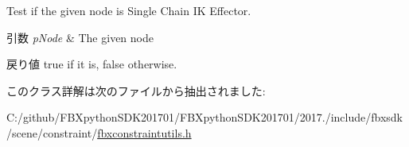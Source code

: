 Test if the given node is Single Chain IK Effector. 
\begin{DoxyParams}{引数}
{\em p\+Node} & The given node \\
\hline
\end{DoxyParams}
\begin{DoxyReturn}{戻り値}
{\ttfamily true} if it is, {\ttfamily false} otherwise. 
\end{DoxyReturn}


このクラス詳解は次のファイルから抽出されました\+:\begin{DoxyCompactItemize}
\item 
C\+:/github/\+F\+B\+Xpython\+S\+D\+K201701/\+F\+B\+Xpython\+S\+D\+K201701/2017./include/fbxsdk/scene/constraint/\hyperlink{fbxconstraintutils_8h}{fbxconstraintutils.\+h}\end{DoxyCompactItemize}
